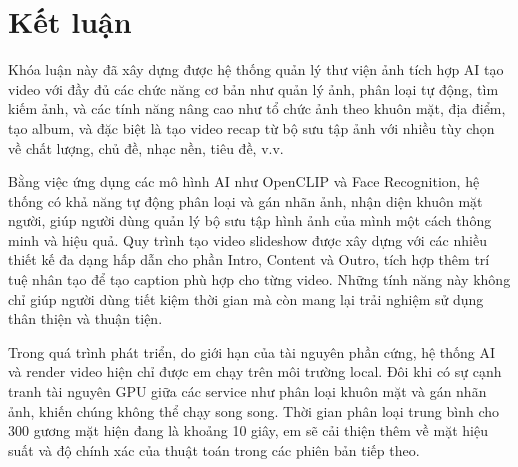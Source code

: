 \chapter*{Kết luận}

Khóa luận này đã xây dựng được hệ thống quản lý thư viện ảnh tích hợp AI tạo video với đầy đủ các chức năng cơ bản như quản lý ảnh, phân loại tự động, tìm kiếm ảnh, và các tính năng nâng cao như tổ chức ảnh theo khuôn mặt, địa điểm, tạo album, và đặc biệt là tạo video recap từ bộ sưu tập ảnh với nhiều tùy chọn về chất lượng, chủ đề, nhạc nền, tiêu đề, v.v.

Bằng việc ứng dụng các mô hình AI như OpenCLIP và Face Recognition, hệ thống có khả năng tự động phân loại và gán nhãn ảnh, nhận diện khuôn mặt người, giúp người dùng quản lý bộ sưu tập hình ảnh của mình một cách thông minh và hiệu quả. Quy trình tạo video slideshow được xây dựng với các nhiều thiết kế đa dạng hấp dẫn cho phần Intro, Content và Outro, tích hợp thêm trí tuệ nhân tạo để tạo caption phù hợp cho từng video. Những tính năng này không chỉ giúp người dùng tiết kiệm thời gian mà còn mang lại trải nghiệm sử dụng thân thiện và thuận tiện.

Trong quá trình phát triển, do giới hạn của tài nguyên phần cứng, hệ thống AI và render video hiện chỉ được em chạy trên môi trường local. Đôi khi có sự cạnh tranh tài nguyên GPU giữa các service như phân loại khuôn mặt và gán nhãn ảnh, khiến chúng không thể chạy song song. Thời gian phân loại trung bình cho 300 gương mặt hiện đang là khoảng 10 giây, em sẽ cải thiện thêm về mặt hiệu suất và độ chính xác của thuật toán trong các phiên bản tiếp theo.